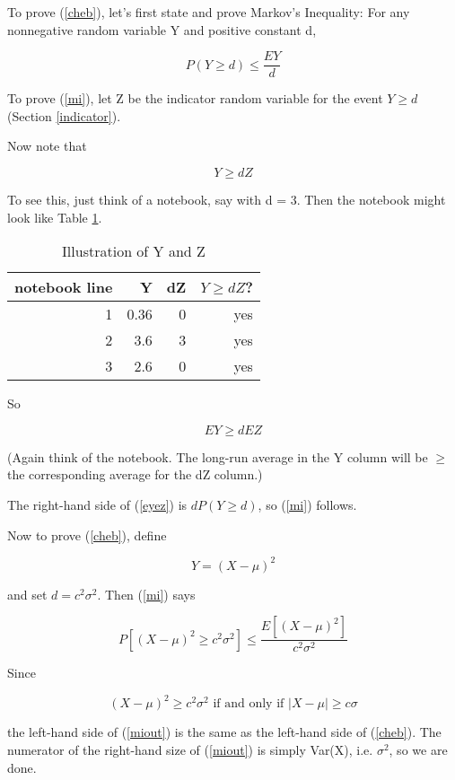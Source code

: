 To prove (\ref{cheb}), let's first state and prove Markov's Inequality:
For any nonnegative random variable Y and positive constant d,

\begin{equation}
\label{mi}
P(Y \geq d) \leq \frac{EY}{d}
\end{equation}

To prove (\ref{mi}), let Z be the indicator random variable for the
event $Y \geq d$ (Section \ref{indicator}). 

Now note that

\begin{equation}
Y \geq d Z
\end{equation}

To see this, just think of a notebook, say with d = 3.  Then the
notebook might look like Table \ref{ygeqz}.

\begin{table}
\begin{center}
\vskip 0.5in

\begin{tabular}{|r|r|r|r|}
\hline
notebook line & Y & dZ & $Y \geq dZ$? \\ \hline
\hline
1 & 0.36 & 0 & yes \\ \hline
2 & 3.6 & 3 & yes \\ \hline
3 & 2.6 & 0 & yes \\ \hline
\end{tabular}

\end{center}
\caption{Illustration of Y and Z}
\label{ygeqz}
\end{table}

So

\begin{equation}
\label{eyez}
EY \geq d EZ
\end{equation}

(Again think of the notebook.  The long-run average in the Y column will
be $\geq$ the corresponding average for the dZ column.)

The right-hand side of (\ref{eyez}) is $d P(Y \geq d)$, so (\ref{mi})
follows.

Now to prove (\ref{cheb}), define

\begin{equation}
Y = (X-\mu)^2
\end{equation}

and set $d = c^2 \sigma^2$.  Then (\ref{mi}) says

\begin{equation}
\label{miout}
P [ (X-\mu)^2 \geq c^2 \sigma^2 ]
\leq 
\frac
{E [(X-\mu)^2]}
{c^2 \sigma^2}
\end{equation}

Since

\begin{equation}
(X-\mu)^2 \geq c^2 \sigma^2 \textrm{ if and only if }
|X-\mu| \geq c \sigma
\end{equation}

the left-hand side of (\ref{miout}) is the same as the left-hand side of
(\ref{cheb}).  The numerator of the right-hand size of (\ref{miout}) is
simply Var(X), i.e. $\sigma^2$, so we are done.

